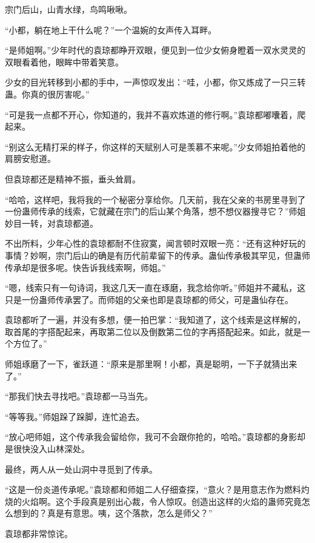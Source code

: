 
\begin{this_body}

宗门后山，山青水绿，鸟鸣啾啾。

“小都，躺在地上干什么呢？”一个温婉的女声传入耳畔。

“是师姐啊。”少年时代的袁琼都睁开双眼，便见到一位少女俯身瞪着一双水灵灵的双眼看着他，眼眸中带着笑意。

少女的目光转移到小都的手中，一声惊叹发出：“哇，小都，你又炼成了一只三转蛊。你真的很厉害呢。”

“可是我一点都不开心，你知道的，我并不喜欢炼道的修行啊。”袁琼都嘟囔着，爬起来。

“别这么无精打采的样子，你这样的天赋别人可是羡慕不来呢。”少女师姐拍着他的肩膀安慰道。

但袁琼都还是精神不振，垂头耸肩。

“哈哈，这样吧，我将我的一个秘密分享给你。几天前，我在父亲的书房里寻到了一份蛊师传承的线索，它就藏在宗门的后山某个角落，想不想仪器搜寻它？”师姐妙目一转，对袁琼都道。

不出所料，少年心性的袁琼都耐不住寂寞，闻言顿时双眼一亮：“还有这种好玩的事情？妙啊，宗门后山的确是有历代前辈留下的传承。蛊仙传承极其罕见，但蛊师传承却是很多呢。快告诉我线索啊，师姐。”

“嗯，线索只有一句诗词，我这几天一直在琢磨，我念给你听。”师姐并不藏私，这只是一份蛊师传承罢了。而师姐的父亲也即是袁琼都的师父，可是蛊仙存在。

袁琼都听了一遍，并没有多想，便一拍巴掌：“我知道了，这个线索是这样解的，取首尾的字搭配起来，再取第二位以及倒数第二位的字再搭配起来。如此，就是一个方位了。”

师姐琢磨了一下，雀跃道：“原来是那里啊！小都，真是聪明，一下子就猜出来了。”

“那我们快去寻找吧。”袁琼都一马当先。

“等等我。”师姐跺了跺脚，连忙追去。

“放心吧师姐，这个传承我会留给你，我可不会跟你抢的，哈哈。”袁琼都的身影却是很快没入山林深处。

最终，两人从一处山洞中寻觅到了传承。

“这是一份炎道传承呢。”袁琼都和师姐二人仔细查探，“意火？是用意志作为燃料灼烧的火焰啊。这个手段真是别出心裁，令人惊叹。创造出这样的火焰的蛊师究竟怎么想到的？真是有意思。咦，这个落款，怎么是师父？”

袁琼都非常惊诧。


\end{this_body}
